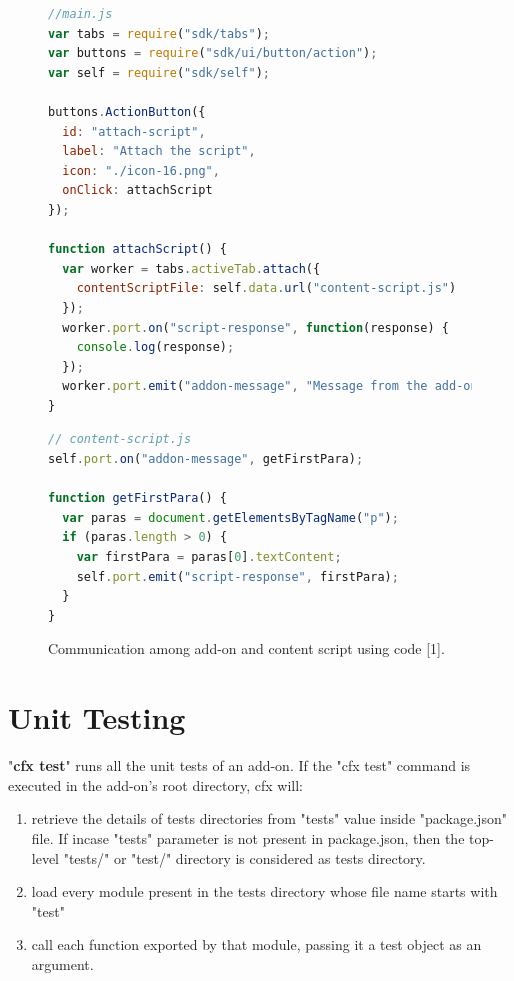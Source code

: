 \begin{figure}[h]
  \centering

\begin{lstlisting}[language=JavaScript] 
//main.js
var tabs = require("sdk/tabs");
var buttons = require("sdk/ui/button/action");
var self = require("sdk/self");

buttons.ActionButton({
  id: "attach-script",
  label: "Attach the script",
  icon: "./icon-16.png",
  onClick: attachScript
});

function attachScript() {
  var worker = tabs.activeTab.attach({
    contentScriptFile: self.data.url("content-script.js")
  });
  worker.port.on("script-response", function(response) {
    console.log(response);
  });
  worker.port.emit("addon-message", "Message from the add-on");
}
\end{lstlisting}
\begin{lstlisting}[language=JavaScript] 
// content-script.js
self.port.on("addon-message", getFirstPara);

function getFirstPara() {
  var paras = document.getElementsByTagName("p");
  if (paras.length > 0) {
    var firstPara = paras[0].textContent;
    self.port.emit("script-response", firstPara);
  }
}
\end{lstlisting}
    \caption[Communication among add-on and content script using code]{Communication among add-on and content script using code [1].}
    \label{fig:communication}
\end{figure}

\section{Unit Testing}

"\textbf{cfx test}" runs all the unit tests of an add-on. If the "cfx test" command is executed in the add-on's root directory, cfx will:
\begin{enumerate}
\item retrieve the details of tests directories from "tests" value inside "package.json" file. If incase "tests" parameter is not present in package.json, then the top-level "tests/" or "test/" directory is considered as tests directory.
\item load every module present in the tests directory whose file name starts with "test"
\item call each function exported by that module, passing it a test object as an argument.
\end{enumerate}


